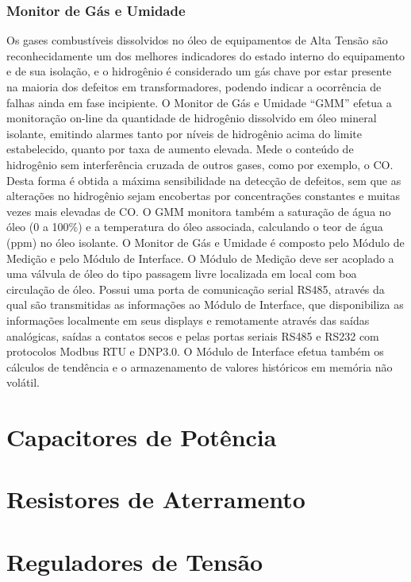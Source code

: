 \documentclass[a5paper,english,spanish,brazil]{ufsc-thesis}
\begin{document}
		\subsubsection{Monitor de Gás e Umidade}
		Os gases combustíveis dissolvidos no óleo de equipamentos de Alta Tensão são reconhecidamente um dos melhores indicadores do estado interno do equipamento e de sua isolação, e o hidrogênio é considerado um gás chave por estar presente na maioria dos defeitos em transformadores, podendo indicar a ocorrência de falhas ainda em fase incipiente. O Monitor de Gás e Umidade “GMM” efetua a monitoração on-line da quantidade de hidrogênio dissolvido em óleo mineral isolante, emitindo alarmes tanto por níveis de hidrogênio acima do limite estabelecido, quanto por taxa de aumento elevada. Mede o conteúdo de hidrogênio sem interferência cruzada de outros gases, como por exemplo, o CO. Desta forma é obtida a máxima sensibilidade na detecção de defeitos, sem que as alterações no hidrogênio sejam encobertas por concentrações constantes e muitas vezes mais elevadas de CO. O GMM monitora também a saturação de água no óleo (0 a 100\%) e a temperatura do óleo associada, calculando o teor de água (ppm) no óleo isolante. O Monitor de Gás e Umidade é composto pelo Módulo de Medição e pelo Módulo de Interface. O Módulo de Medição deve ser acoplado a uma válvula de óleo do tipo passagem livre localizada em local com boa circulação de óleo. Possui uma porta de comunicação serial RS485, através da qual são transmitidas as informações ao Módulo de Interface, que disponibiliza as informações localmente em seus displays e remotamente através das saídas analógicas, saídas a contatos secos e pelas portas seriais RS485 e RS232 com protocolos Modbus RTU e DNP3.0. O Módulo de Interface efetua também os cálculos de tendência e o armazenamento de valores históricos em memória não volátil.

	\section{Capacitores de Potência}

	\section{Resistores de Aterramento}

	\section{Reguladores de Tensão}
\end{document}
